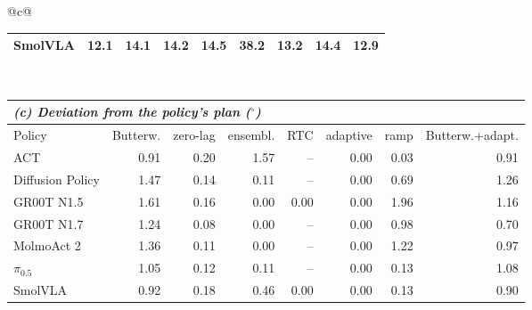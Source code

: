 \begin{tabular}{@{}c@{}}
\begin{tabular}{l rrrrrrrr}
SmolVLA & 12.1 & 14.1 & 14.2 & 14.5 & 38.2 & 13.2 & 14.4 & 12.9 \\
\bottomrule
\end{tabular}
\\[8pt]
\begin{tabular}{l rrrrrrr}
\toprule
\multicolumn{8}{l}{\textit{(c) Deviation from the policy's plan ($^\circ$)}} \\
\midrule
Policy & Butterw. & zero-lag & ensembl. & RTC & adaptive & ramp & Butterw.+adapt. \\
\midrule
ACT & 0.91 & 0.20 & 1.57 & -- & 0.00 & 0.03 & 0.91 \\
Diffusion Policy & 1.47 & 0.14 & 0.11 & -- & 0.00 & 0.69 & 1.26 \\
GR00T N1.5 & 1.61 & 0.16 & 0.00 & 0.00 & 0.00 & 1.96 & 1.16 \\
GR00T N1.7 & 1.24 & 0.08 & 0.00 & -- & 0.00 & 0.98 & 0.70 \\
MolmoAct 2 & 1.36 & 0.11 & 0.00 & -- & 0.00 & 1.22 & 0.97 \\
$\pi_{0.5}$ & 1.05 & 0.12 & 0.11 & -- & 0.00 & 0.13 & 1.08 \\
SmolVLA & 0.92 & 0.18 & 0.46 & 0.00 & 0.00 & 0.13 & 0.90 \\
\bottomrule
\end{tabular}
\end{tabular}
